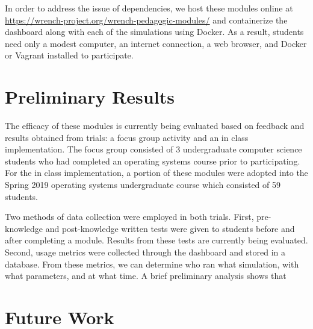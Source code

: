 \documentclass{article} \usepackage{indentfirst}
\begin{document}
In order to address the issue of dependencies, we host these modules online at
\underline{https://wrench-project.org/wrench-pedagogic-modules/} and
containerize the dashboard along with each of the simulations using Docker. As a
result, students need only a modest computer, an internet connection, a web
browser, and Docker or Vagrant installed to participate.

\section{Preliminary Results} The efficacy of these modules is currently being
evaluated based on feedback and results obtained from trials: a focus group
activity and an in class implementation. The focus group consisted of  3
undergraduate computer science students who had completed an operating systems
course  prior to participating. For the in class implementation, a portion of
these modules were adopted into the Spring 2019 operating systems undergraduate
course which consisted of 59 students.

Two methods of data collection were employed in both trials. First,
pre-knowledge and post-knowledge written tests were given to students before and
after completing a module. Results from these tests are currently being
evaluated. Second, usage metrics were collected through the dashboard and stored
in a database. From these metrics, we can determine who ran what simulation,
with what parameters, and at what time. A brief preliminary analysis shows that 


\section{Future Work}

 
\end{document}
